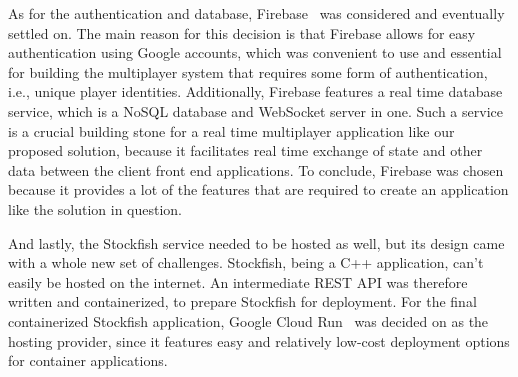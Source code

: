 As for the authentication and database, Firebase~\cite{firebase} was considered and eventually settled on.
The main reason for this decision is that Firebase allows for easy authentication using Google accounts, which was
convenient to use and essential for building the multiplayer system that requires some form of authentication,
i.e., unique player identities.
Additionally, Firebase features a real time database service, which is a NoSQL database and WebSocket server in one.
Such a service is a crucial building stone for a real time multiplayer application like our proposed solution, because
it facilitates real time exchange of state and other data between the client front end applications.
To conclude, Firebase was chosen because it provides a lot of the features that are required to create an application
like the solution in question.

And lastly, the Stockfish service needed to be hosted as well, but its design came with a whole new set of challenges.
Stockfish, being a C++ application, can't easily be hosted on the internet.
An intermediate REST API was therefore written and containerized, to prepare Stockfish for deployment.
For the final containerized Stockfish application, Google Cloud Run~\cite{google-cloud-run} was decided on as the
hosting provider, since it features easy and relatively low-cost deployment options for container applications.

